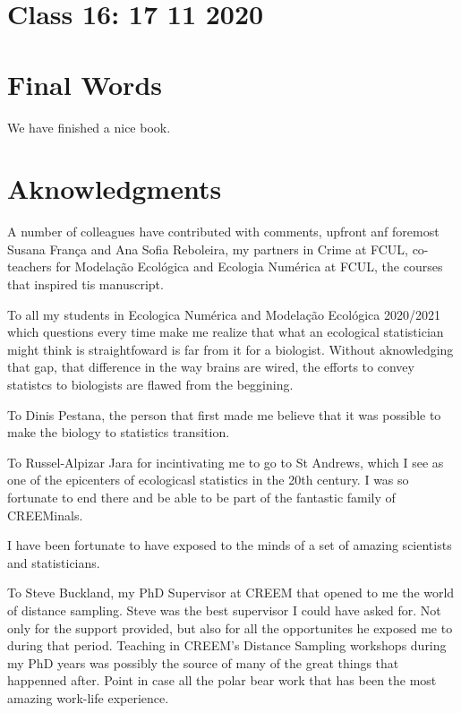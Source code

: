 \documentclass[
]{book}
\begin{document}
\hypertarget{aula16}{%
\chapter{Class 16: 17 11 2020}\label{aula16}}

\hypertarget{final-words}{%
\chapter{Final Words}\label{final-words}}

We have finished a nice book.

\hypertarget{aknowledgments}{%
\chapter{Aknowledgments}\label{aknowledgments}}

A number of colleagues have contributed with comments, upfront anf foremost Susana França and Ana Sofia Reboleira, my partners in Crime at FCUL, co-teachers for Modelação Ecológica and Ecologia Numérica at FCUL, the courses that inspired tis manuscript.

To all my students in Ecologica Numérica and Modelação Ecológica 2020/2021 which questions every time make me realize that what an ecological statistician might think is straightfoward is far from it for a biologist. Without aknowledging that gap, that difference in the way brains are wired, the efforts to convey statistcs to biologists are flawed from the beggining.

To Dinis Pestana, the person that first made me believe that it was possible to make the biology to statistics transition.

To Russel-Alpizar Jara for incintivating me to go to St Andrews, which I see as one of the epicenters of ecologicasl statistics in the 20th century. I was so fortunate to end there and be able to be part of the fantastic family of CREEMinals.

I have been fortunate to have exposed to the minds of a set of amazing scientists and statisticians.

To Steve Buckland, my PhD Supervisor at CREEM that opened to me the world of distance sampling. Steve was the best supervisor I could have asked for. Not only for the support provided, but also for all the opportunites he exposed me to during that period. Teaching in CREEM's Distance Sampling workshops during my PhD years was possibly the source of many of the great things that happenned after. Point in case all the polar bear work that has been the most amazing work-life experience.
\end{document}
